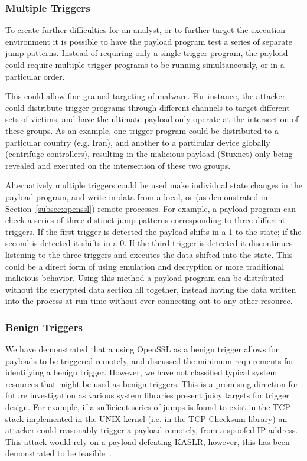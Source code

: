 \subsubsection{Multiple Triggers}
To create further difficulties for an analyst, or to further target the
execution environment it is possible to have the payload program test a series
of separate jump patterns. Instead of requiring only a single trigger program,
the payload could require multiple trigger programs to be running
simultaneously, or in a particular order.

This could allow fine-grained targeting of malware. For instance, the attacker
could distribute trigger programs through different channels to target different sets
of victims, and have the ultimate payload only operate at the intersection of
these groups. As an example, one trigger program could be distributed to a
particular country (e.g. Iran), and another to a particular device globally
(centrifuge controllers), resulting in the malicious payload (Stuxnet) only
being revealed and executed on the intersection of these two groups.


\smallskip

Alternatively multiple triggers could be used make individual state changes in
the payload program, and write in data from a local, or (as demonstrated in
Section~\ref{subsec:openssl}) remote processes. For example, a payload program
can check a series of three distinct jump patterns corresponding to three
different triggers. If the first trigger is detected the payload shifts in a 1
to the state; if the second is detected it shifts in a 0. If the third trigger
is detected it discontinues listening to the three triggers and executes the
data shifted into the state.
This could be a direct form of \speculake using emulation and
decryption or more traditional malicious behavior. Using this method a payload
program can be distributed without the encrypted data section all together,
instead having the data written into the process at run-time without ever
connecting out to any other resource.

\subsubsection{Benign Triggers}
We have demonstrated that a using \allowbreak OpenSSL as a benign trigger allows for
\speculake payloads to be triggered remotely, and discussed the minimum
requirements for identifying a benign trigger. However, we have not classified
typical system resources that might be used as benign triggers. This is a
promising direction for future investigation as various system libraries present
juicy targets for trigger design. For example, if a sufficient series of jumps
is found to exist in the TCP stack implemented in the UNIX kernel (i.e. in the
TCP Checksum library) an attacker could reasonably trigger a \speculake payload
remotely, from a spoofed IP address. This attack would rely on a payload
defeating KASLR, however, this has been demonstrated to be
feasible~\cite{gruss2017kaslr,evtyushkin2016jump}.

